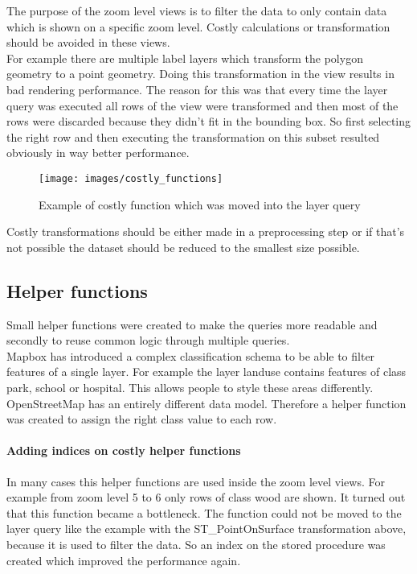 The purpose of the zoom level views is to filter the data to only contain data which is shown on a specific zoom level. Costly calculations or transformation should be avoided in these views.\\
For example there are multiple label layers which transform the polygon geometry to a point geometry. Doing this transformation in the view results in bad rendering performance. The reason for this was that every time the layer query was executed all rows of the view were transformed and then most of the rows were discarded because they didn't fit in the bounding box. So first selecting the right row and then executing the transformation on this subset resulted obviously in way better performance.

\begin{figure}[H]
\centering
\texttt{[image: images/costly\_functions]}
\caption{Example of costly function which was moved into the layer query}
\end{figure}

\begin{tcolorbox}[arc=0mm,boxrule=1pt,title=Learning]
Costly transformations should be either made in a preprocessing step or if that's not possible the dataset should be reduced to the smallest size possible.
\end{tcolorbox}

\subsection{Helper functions}

Small helper functions were created to make the queries more readable and secondly to reuse common logic through multiple queries.\\ 
Mapbox has introduced a complex classification schema to be able to filter features of a single layer. For example the layer landuse contains features of class park, school or hospital. This allows people to style these areas differently. OpenStreetMap has an entirely different data model. Therefore a helper function was created to assign the right class value to each row.

\paragraph{Adding indices on costly helper functions} In many cases this helper functions are used inside the zoom level views. For example from zoom level 5 to 6 only rows of class wood are shown. It turned out that this function became a bottleneck. The function could not be moved to the layer query like the example with the ST\_PointOnSurface transformation above, because it is used to filter the data. So an index on the stored procedure was created which improved the performance again. 

